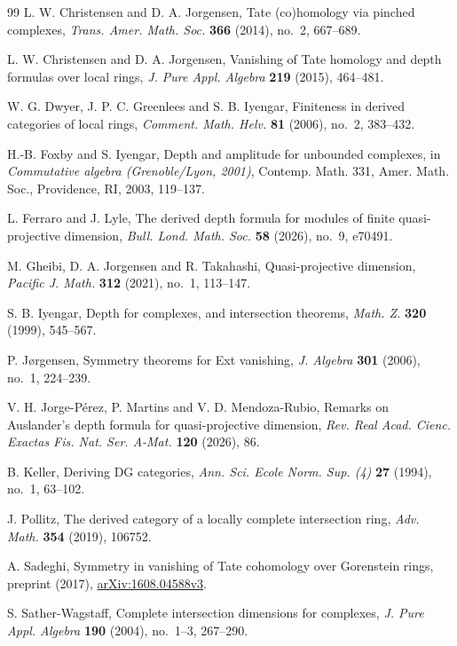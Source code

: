 \documentclass[10pt, a4paper,reqno]{amsart}
\theoremstyle{definition}
\theoremstyle{remark}
\numberwithin{equation}{thm}
\begin{document}
\begin{thebibliography}{99}
{\sc L. W. Christensen and D. A. Jorgensen},
Tate (co)homology via pinched complexes,
{\em Trans. Amer. Math. Soc.} \textbf{366} (2014), no.~2, 667--689.

{\sc L. W. Christensen and D. A. Jorgensen},
Vanishing of Tate homology and depth formulas over local rings,
{\em J. Pure Appl. Algebra} \textbf{219} (2015), 464--481.

{\sc W. G. Dwyer, J. P. C. Greenlees and S. B. Iyengar},
Finiteness in derived categories of local rings,
{\em Comment. Math. Helv.} \textbf{81} (2006), no.~2, 383--432.

{\sc H.-B. Foxby and S. Iyengar},
Depth and amplitude for unbounded complexes,
in {\em Commutative algebra (Grenoble/Lyon, 2001)},
Contemp. Math. 331, Amer. Math. Soc., Providence, RI, 2003, 119--137.

{\sc L. Ferraro and J. Lyle},
The derived depth formula for modules of finite quasi-projective dimension,
{\em Bull. Lond. Math. Soc.} \textbf{58} (2026), no.~9, e70491.

{\sc M. Gheibi, D. A. Jorgensen and R. Takahashi},
Quasi-projective dimension,
{\em Pacific J. Math.} \textbf{312} (2021), no.~1, 113--147.

{\sc S. B. Iyengar},
Depth for complexes, and intersection theorems,
{\em Math. Z.} \textbf{320} (1999), 545--567.

{\sc P. J{\o}rgensen},
Symmetry theorems for Ext vanishing,
{\em J. Algebra} \textbf{301} (2006), no.~1, 224--239.

{\sc V. H. Jorge-P\'erez, P. Martins and V. D. Mendoza-Rubio},
Remarks on Auslander's depth formula for quasi-projective dimension,
{\em Rev. Real Acad. Cienc. Exactas Fis. Nat. Ser. A-Mat.} 
\textbf{120} (2026), 86.

{\sc B. Keller},
Deriving DG categories,
{\em Ann. Sci. Ecole Norm. Sup. (4)} \textbf{27} (1994), no.~1, 63--102.

{\sc J. Pollitz},
The derived category of a locally complete intersection ring,
{\em Adv. Math.} \textbf{354} (2019), 106752.

{\sc A. Sadeghi},
Symmetry in vanishing of Tate cohomology over Gorenstein rings, 
preprint (2017), \href{https://arxiv.org/abs/1608.04588}{arXiv:1608.04588v3}. 

{\sc S. Sather-Wagstaff},
Complete intersection dimensions for complexes,
{\em J. Pure Appl. Algebra} \textbf{190} (2004), no.~1--3, 267--290.


\end{thebibliography}
\end{document}
